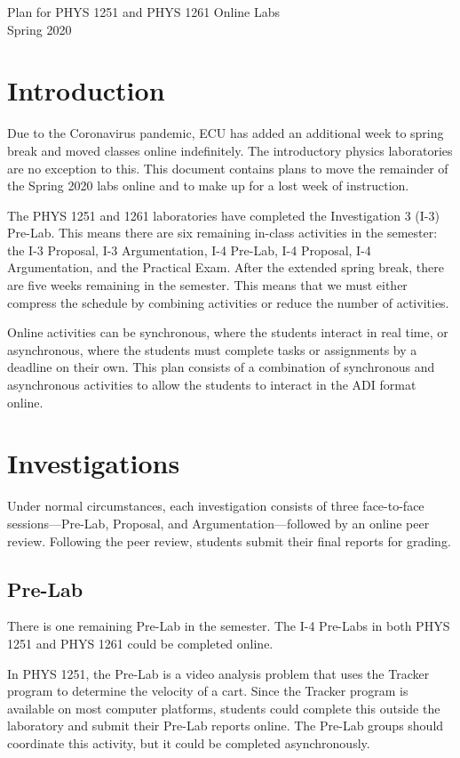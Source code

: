 \documentclass[11pt, oneside]{article}
\begin{document}
\begin{center}
{\Large Plan for PHYS 1251 and PHYS 1261 Online Labs}\\
Spring 2020
\end{center}

\section{Introduction}

Due to the Coronavirus pandemic, ECU has added an additional week to spring break and moved classes online indefinitely.  The introductory physics laboratories are no exception to this.  This document contains plans to move the remainder of the Spring 2020 labs online and to make up for a lost week of instruction.

The PHYS 1251 and 1261 laboratories have completed the Investigation 3 (I-3) Pre-Lab.  This means there are six remaining in-class activities in the semester: the I-3 Proposal, I-3 Argumentation, I-4 Pre-Lab, I-4 Proposal, I-4 Argumentation, and the Practical Exam.  After the extended spring break, there are five weeks remaining in the semester.  This means that we must either compress the schedule by combining activities or reduce the number of activities.

Online activities can be synchronous, where the students interact in real time, or asynchronous, where the students must complete tasks or assignments by a deadline on their own.  This plan consists of a combination of synchronous and asynchronous activities to allow the students to interact in the ADI format online.

\section{Investigations}

Under normal circumstances, each investigation consists of three face-to-face sessions---Pre-Lab, Proposal, and Argumentation---followed by an online peer review. Following the peer review, students submit their final reports for grading.

\subsection{Pre-Lab}

There is one remaining Pre-Lab in the semester.  The I-4 Pre-Labs in both PHYS 1251 and PHYS 1261 could be completed online.  

In PHYS 1251, the Pre-Lab is a video analysis problem that uses the Tracker program to determine the velocity of a cart.  Since the Tracker program is available on most computer platforms, students could complete this outside the laboratory and submit their Pre-Lab reports online.  The Pre-Lab groups should coordinate this activity, but it could be completed asynchronously.
\end{document}
